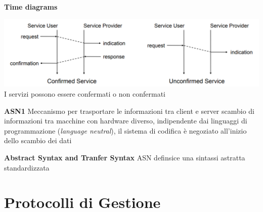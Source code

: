 \documentclass{article}
\begin{document}
\par \textbf{Time diagrams}

\includegraphics[width=\linewidth]{7.png}
I servizi possono essere confermati o non confermati
\par \textbf{ASN1}
Meccanismo per trasportare le informazioni tra client e server scambio di informazioni tra macchine con hardware diverso, indipendente dai linguaggi di programmazione (\textit{language neutral}), il sistema di codifica è negoziato all'inizio dello scambio dei dati
\par \textbf{Abstract Syntax and Tranfer Syntax}
ASN definsice una sintassi astratta standardizzata

\section{Protocolli di Gestione}
\end{document}
